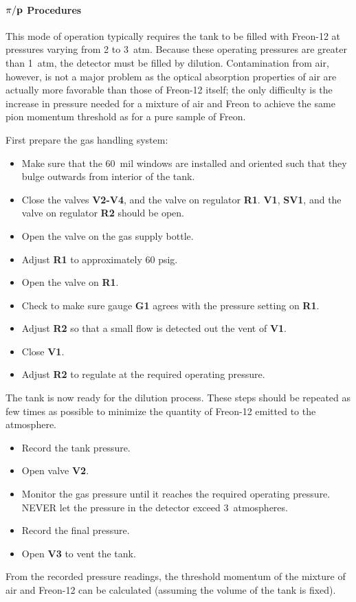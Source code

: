 {\paragraph{$\bf{\pi}/p$ Procedures}
This mode of operation typically requires the tank to be filled with Freon-12
at pressures varying from 2 to 3~atm.  Because these operating pressures are
greater than 1~atm, the detector must be filled by dilution.  Contamination
from air, however, is not a major problem as the optical absorption properties
of air are actually more favorable than those of Freon-12 itself; the only
difficulty is the increase in pressure needed for a mixture of air and Freon
to achieve the same pion momentum threshold as for a pure sample of Freon.

First prepare the gas handling system:
\begin{itemize}
\item Make sure that the 60~mil windows are installed and oriented such that
they bulge outwards from interior of the tank.
\item Close the valves {\bf V2-V4}, and the valve on regulator {\bf R1}.
{\bf V1}, {\bf SV1}, and the valve on regulator {\bf R2} should be
open.
\item Open the valve on the gas supply bottle.
\item Adjust {\bf R1} to approximately 60 psig.
\item Open the valve on {\bf R1}.
\item Check to make sure gauge {\bf G1} agrees with the pressure setting
on {\bf R1}.
\item Adjust {\bf R2} so that a small flow is detected out the vent of
{\bf V1}.
\item Close {\bf V1}.
\item Adjust {\bf R2} to regulate at the required operating pressure.
\end{itemize}
The tank is now ready for the dilution process.  These steps should be
repeated as few times as possible to minimize the quantity of Freon-12 emitted
to the atmosphere.
\begin{itemize}
\item Record the tank pressure.
\item Open valve {\bf V2}.
\item Monitor the gas pressure until it reaches the required operating pressure.
NEVER let the pressure in the detector exceed 3~atmospheres.
\item Record the final pressure.
\item Open {\bf V3} to vent the tank.
\end{itemize}
From the recorded pressure readings, the threshold momentum of the mixture
of air and Freon-12 can be calculated (assuming the volume of the tank is
fixed).



}
